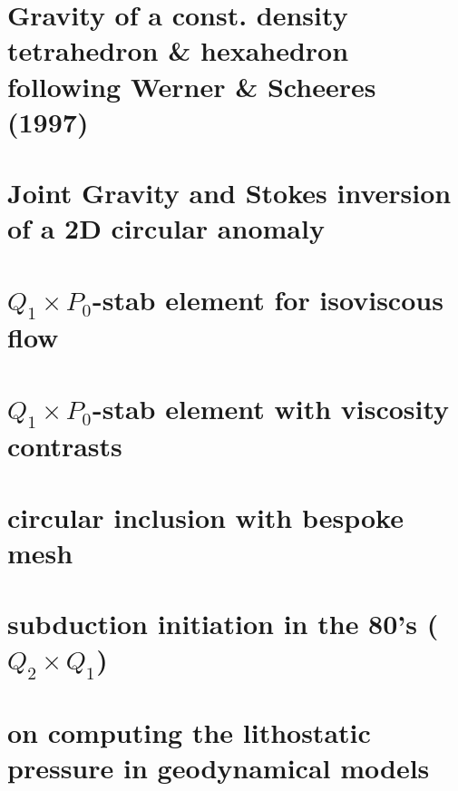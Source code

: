 \documentclass[a4paper,11pt]{report}
\begin{document}
\chapter{Gravity of a const. density tetrahedron \& hexahedron following Werner \& Scheeres (1997) \label{f113}} %

\chapter{Joint Gravity and Stokes inversion of a 2D circular anomaly \label{f114}} %

\chapter{$Q_1\times P_0$-stab element for isoviscous flow \label{f115}} %

\chapter{$Q_1\times P_0$-stab element with viscosity contrasts\label{f116}} %

\chapter{circular inclusion with bespoke mesh \label{f117}} %

\chapter{subduction initiation in the 80's ($Q_2\times Q_1$) \label{f118}} %

\chapter{on computing the lithostatic pressure in geodynamical models \label{f119}} %
\end{document}
